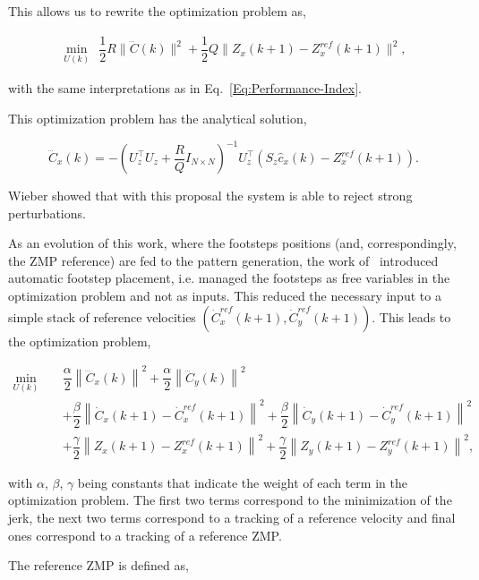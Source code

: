 This allows us to rewrite the optimization problem as,

\begin{eqnarray}
\nonumber
\underset{U(k)}{\min} ~~ \dfrac{1}{2} R \| \dddot{{C}}(k) \|^2 + \dfrac{1}{2} Q \|{Z}_x(k+1) - {Z}^{ref}_x(k+1) \|^2,
\label{Eq:MinJerk}
\end{eqnarray}
 
with the same interpretations as in Eq.~\ref{Eq:Performance-Index}.

This optimization problem has the analytical solution,

\begin{equation}
\dddot{{C}}_x(k) = -({U}_z^{\top} {U}_z + \dfrac{R}{Q} {I}_{N \times N})^{-1} {U}_z^{\top}({S}_z \hat{c}_x(k) - {Z}_x^{ref}(k+1)).
\end{equation}

Wieber showed that with this proposal the system is able to reject strong perturbations.

As an evolution of this work, where the footsteps positions (and, correspondingly, the ZMP reference) are fed to the pattern generation, the work of~\citep{HerdtAR2010} introduced automatic footstep placement, i.e. managed the footsteps as free variables in the optimization problem and not as inputs. This reduced the necessary input to a simple stack of reference velocities $(\dot{C}_{x}^{ref}(k+1),\dot{C}_{y}^{ref}(k+1))$. This leads to the optimization problem,

\begin{eqnarray}
\nonumber
 \underset{U(k)}{\min} \; && \dfrac{\alpha}{2} \left\| \dddot{C}_x(k) \right\|^2 + \dfrac{\alpha}{2} \left\| \dddot{C}_y(k) \right\|^2 \\
&& + \dfrac{\beta}{2} \left\| \dot{C}_{x}(k+1) - \dot{C}_{x}^{ref}(k+1) \right\|^2 + \dfrac{\beta}{2} \left\| \dot{C}_{y}(k+1) - \dot{C}_{y}^{ref}(k+1) \right\|^2  \nonumber \\
&& + \dfrac{\gamma}{2} \left\| Z_x(k+1) - Z_x^{ref}(k+1) \right\|^2 + \dfrac{\gamma}{2} \left\| Z_y(k+1) - Z_y^{ref}(k+1) \right\|^2,
\label{Eq:MinJerk}
\end{eqnarray}

with $\alpha$, $\beta$, $\gamma$ being constants that indicate the weight of each term in the optimization problem. The first two terms correspond to the minimization of the jerk, the next two terms correspond to a tracking of a reference velocity and final ones correspond to a tracking of a reference ZMP.

The reference ZMP is defined as,

